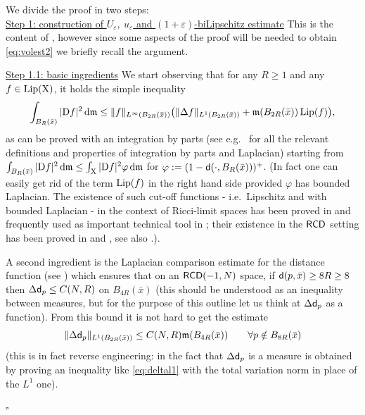 \documentclass[reqno,11pt]{article}
\numberwithin{equation}{section}
\newcommand{\mm}{{\mbox{\boldmath$m$}}}
\newcommand{\sfd}{{\sf d}}
\newcommand{\Lip}{\mathop{\rm Lip}\nolimits}          %
\renewcommand{\d}{{\mathrm d}}
\newcommand{\eps}{\varepsilon}
\renewcommand{\mm}{\mathfrak m}                                %
\renewenvironment{proof}{\removelastskip\par\medskip   %
\noindent{\em Proof} \rm}{\penalty-20\null\hfill$\square$\par\medbreak}
\newcommand{\X}{{\rm X}}
\newcommand{\RCD}{{\sf RCD}}
\newcommand{\D}{{\rm D}}
\begin{document}
\begin{proof} We divide the proof in two steps:\\
\noindent
    \underline{Step 1: construction of $U_\eps,\ u_\eps$ and $(1+\eps)$-biLipschitz estimate}  This is the content of \cite[Theorem 6.8]{Mondino-Naber14}, however since some aspects of the proof will be needed to obtain \eqref{eq:volest2} we briefly recall the argument.

    \underline{Step 1.1: basic ingredients} We start observing that for any $R\geq 1$ and { any \(f\in \Lip(\X)\)}, it holds the simple inequality
    \begin{equation}
\label{eq:grad2}
\int_{B_R(\bar x)}|\D f|^2\,\d\mm\leq\|f\|_{L^\infty(B_{2R}(\bar x))}\big(\|\Delta f\|_{L^1(B_{2R}(\bar x))}+\mm(B_{2R}(\bar x))\Lip(f)\big),
\end{equation}
as can be proved with an integration by parts (see e.g.\ \cite{Gigli12} for all the relevant definitions and properties of integration by parts and Laplacian) starting from $\int_{B_R(\bar x)}|\D f|^2\,\d\mm\leq\int_\X|\D f|^2\varphi\,\d\mm$ for   $\varphi:=(1-\sfd(\cdot,B_R(\bar x)))^+$. (In fact one can easily get rid of the term $\Lip(f)$ in the right hand side provided  $\varphi$ has bounded Laplacian. The existence of such cut-off functions - i.e.\ Lipschitz and with bounded Laplacian -  in the context of Ricci-limit spaces has been proved in \cite{Cheeger-Colding96} and frequently used as important technical tool in \cite{Cheeger-Colding97I,Cheeger-Colding97II,Cheeger-Colding97III,Colding96,Colding96b,Colding97}; their existence in the $\RCD$ setting has been proved in  \cite[Lemma 6.7]{AmbrosioMondinoSavare13-2} and \cite[Theorem 3.12]{Gigli-Mosconi14}, see also \cite[Lemma 3.1]{Mondino-Naber14}.).

A second ingredient is the Laplacian comparison estimate for the distance function (see \cite{Gigli12}) which ensures that on an $\RCD(-1,N)$ space, if $\sfd(p,\bar x)\geq 8R\geq 8$ then $\Delta\sfd_p\leq C(N,R)$ on $B_{4R}(\bar x)$ (this should be understood as an inequality between measures, but for the purpose of this outline let us think at $\Delta\sfd_p$ as a function). From this bound it is not hard to get the estimate 
\begin{equation}
\label{eq:deltal1}
\|\Delta\sfd_p\|_{L^1(B_{2R}(\bar x))}\leq C(N,R)\mm(B_{4R}(\bar x))\qquad\forall p\notin B_{8R}(\bar x)
\end{equation}
(this is in fact reverse engineering: in  \cite{Gigli12} the fact that $\Delta\sfd_p$ is a measure is obtained by proving an inequality like \eqref{eq:deltal1} with the total variation norm in place of the $L^1$ one).


\end{proof}
\end{document}
